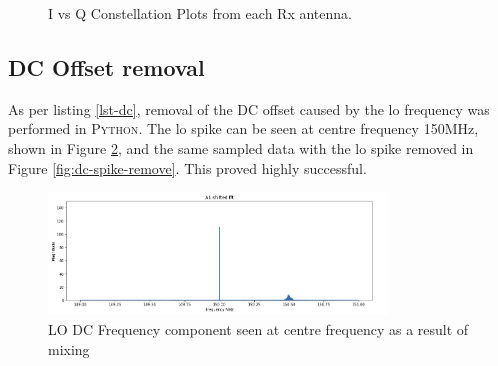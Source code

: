 \documentclass[class=report,11pt,crop=false]{standalone}
\begin{document}
\begin{figure}[h!]\centering
    \hfill 
    \caption{I vs Q Constellation Plots from each Rx antenna.}
    \label{fig:IQconst}
\end{figure}
\subsection{DC Offset removal}
As per listing \ref{lst-dc}, removal of the DC offset caused by the \gls{lo} frequency was performed in \textsc{Python}. The \gls{lo} spike can be seen at centre frequency 150MHz, shown in Figure \ref{fig:dc-spike}, and the same sampled data with the \gls{lo} spike removed in Figure \ref{fig:dc-spike-remove}. This proved highly successful. 

\begin{figure}[!h]
    \centering
    \includegraphics[width=0.8\textwidth]{Images/plots/dcspike.png}
    \caption{LO DC Frequency component seen at centre frequency as a result of mixing}
    \label{fig:dc-spike}
\end{figure}
\end{document}
